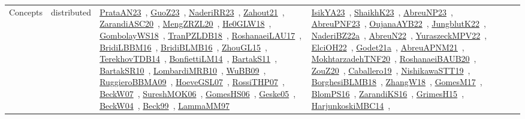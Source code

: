 {\begin{longtable}{lp{3cm}>{\raggedright\arraybackslash}p{6cm}>{\raggedright\arraybackslash}p{6cm}>{\raggedright\arraybackslash}p{8cm}}
Concepts & distributed & \href{works/PrataAN23.pdf}{PrataAN23}~\cite{PrataAN23}, \href{works/GuoZ23.pdf}{GuoZ23}~\cite{GuoZ23}, \href{works/NaderiRR23.pdf}{NaderiRR23}~\cite{NaderiRR23}, \href{works/Zahout21.pdf}{Zahout21}~\cite{Zahout21}, \href{works/ZarandiASC20.pdf}{ZarandiASC20}~\cite{ZarandiASC20}, \href{works/MengZRZL20.pdf}{MengZRZL20}~\cite{MengZRZL20}, \href{works/He0GLW18.pdf}{He0GLW18}~\cite{He0GLW18}, \href{works/GombolayWS18.pdf}{GombolayWS18}~\cite{GombolayWS18}, \href{works/TranPZLDB18.pdf}{TranPZLDB18}~\cite{TranPZLDB18}, \href{works/RoshanaeiLAU17.pdf}{RoshanaeiLAU17}~\cite{RoshanaeiLAU17}, \href{works/BridiLBBM16.pdf}{BridiLBBM16}~\cite{BridiLBBM16}, \href{works/BridiBLMB16.pdf}{BridiBLMB16}~\cite{BridiBLMB16}, \href{works/ZhouGL15.pdf}{ZhouGL15}~\cite{ZhouGL15}, \href{works/TerekhovTDB14.pdf}{TerekhovTDB14}~\cite{TerekhovTDB14}, \href{works/BonfiettiLM14.pdf}{BonfiettiLM14}~\cite{BonfiettiLM14}, \href{works/BartakS11.pdf}{BartakS11}~\cite{BartakS11}, \href{works/BartakSR10.pdf}{BartakSR10}~\cite{BartakSR10}, \href{works/LombardiMRB10.pdf}{LombardiMRB10}~\cite{LombardiMRB10}, \href{works/WuBB09.pdf}{WuBB09}~\cite{WuBB09}, \href{works/RuggieroBBMA09.pdf}{RuggieroBBMA09}~\cite{RuggieroBBMA09}, \href{works/HoeveGSL07.pdf}{HoeveGSL07}~\cite{HoeveGSL07}, \href{works/RossiTHP07.pdf}{RossiTHP07}~\cite{RossiTHP07}, \href{works/BeckW07.pdf}{BeckW07}~\cite{BeckW07}, \href{works/SureshMOK06.pdf}{SureshMOK06}~\cite{SureshMOK06}, \href{works/GomesHS06.pdf}{GomesHS06}~\cite{GomesHS06}, \href{works/Geske05.pdf}{Geske05}~\cite{Geske05}, \href{works/BeckW04.pdf}{BeckW04}~\cite{BeckW04}, \href{works/Beck99.pdf}{Beck99}~\cite{Beck99}, \href{works/LammaMM97.pdf}{LammaMM97}~\cite{LammaMM97} & \href{works/IsikYA23.pdf}{IsikYA23}~\cite{IsikYA23}, \href{works/ShaikhK23.pdf}{ShaikhK23}~\cite{ShaikhK23}, \href{works/AbreuNP23.pdf}{AbreuNP23}~\cite{AbreuNP23}, \href{works/AbreuPNF23.pdf}{AbreuPNF23}~\cite{AbreuPNF23}, \href{works/OujanaAYB22.pdf}{OujanaAYB22}~\cite{OujanaAYB22}, \href{works/JungblutK22.pdf}{JungblutK22}~\cite{JungblutK22}, \href{works/NaderiBZ22a.pdf}{NaderiBZ22a}~\cite{NaderiBZ22a}, \href{works/AbreuN22.pdf}{AbreuN22}~\cite{AbreuN22}, \href{works/YuraszeckMPV22.pdf}{YuraszeckMPV22}~\cite{YuraszeckMPV22}, \href{works/ElciOH22.pdf}{ElciOH22}~\cite{ElciOH22}, \href{works/Godet21a.pdf}{Godet21a}~\cite{Godet21a}, \href{works/AbreuAPNM21.pdf}{AbreuAPNM21}~\cite{AbreuAPNM21}, \href{works/MokhtarzadehTNF20.pdf}{MokhtarzadehTNF20}~\cite{MokhtarzadehTNF20}, \href{works/RoshanaeiBAUB20.pdf}{RoshanaeiBAUB20}~\cite{RoshanaeiBAUB20}, \href{works/ZouZ20.pdf}{ZouZ20}~\cite{ZouZ20}, \href{works/Caballero19.pdf}{Caballero19}~\cite{Caballero19}, \href{works/NishikawaSTT19.pdf}{NishikawaSTT19}~\cite{NishikawaSTT19}, \href{works/BorghesiBLMB18.pdf}{BorghesiBLMB18}~\cite{BorghesiBLMB18}, \href{works/ZhangW18.pdf}{ZhangW18}~\cite{ZhangW18}, \href{works/GomesM17.pdf}{GomesM17}~\cite{GomesM17}, \href{works/BlomPS16.pdf}{BlomPS16}~\cite{BlomPS16}, \href{works/ZarandiKS16.pdf}{ZarandiKS16}~\cite{ZarandiKS16}, \href{works/GrimesH15.pdf}{GrimesH15}~\cite{GrimesH15}, \href{works/HarjunkoskiMBC14.pdf}{HarjunkoskiMBC14}~\cite{HarjunkoskiMBC14}, 
\end{longtable}}
